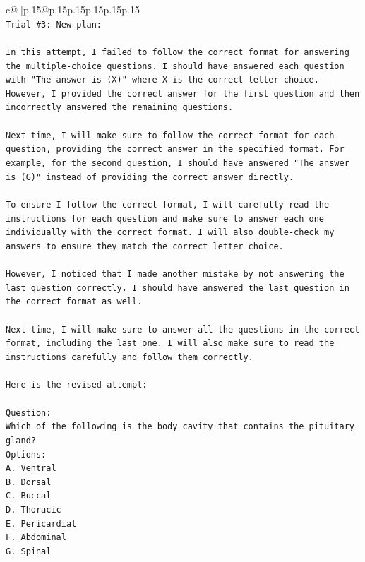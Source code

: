 \documentclass{article}
\begin{document}
{\begin{supertabular}{c@{$\;$}|p{.15\linewidth}@{}p{.15\linewidth}p{.15\linewidth}p{.15\linewidth}p{.15\linewidth}p{.15\linewidth}}
{{{\\ 
\texttt{Trial \#3: New plan: } \\
\\ 
\texttt{In this attempt, I failed to follow the correct format for answering the multiple{-}choice questions. I should have answered each question with "The answer is (X)" where X is the correct letter choice. However, I provided the correct answer for the first question and then incorrectly answered the remaining questions. } \\
\\ 
\texttt{Next time, I will make sure to follow the correct format for each question, providing the correct answer in the specified format. For example, for the second question, I should have answered "The answer is (G)" instead of providing the correct answer directly.} \\
\\ 
\texttt{To ensure I follow the correct format, I will carefully read the instructions for each question and make sure to answer each one individually with the correct format. I will also double{-}check my answers to ensure they match the correct letter choice.} \\
\\ 
\texttt{However, I noticed that I made another mistake by not answering the last question correctly. I should have answered the last question in the correct format as well.} \\
\\ 
\texttt{Next time, I will make sure to answer all the questions in the correct format, including the last one. I will also make sure to read the instructions carefully and follow them correctly.} \\
\\ 
\texttt{Here is the revised attempt:} \\
\\ 
\texttt{Question:} \\
\texttt{Which of the following is the body cavity that contains the pituitary gland?} \\
\texttt{Options:} \\
\texttt{A. Ventral} \\
\texttt{B. Dorsal} \\
\texttt{C. Buccal} \\
\texttt{D. Thoracic} \\
\texttt{E. Pericardial} \\
\texttt{F. Abdominal} \\
\texttt{G. Spinal} \\
}}}
\end{supertabular}}
\end{document}
